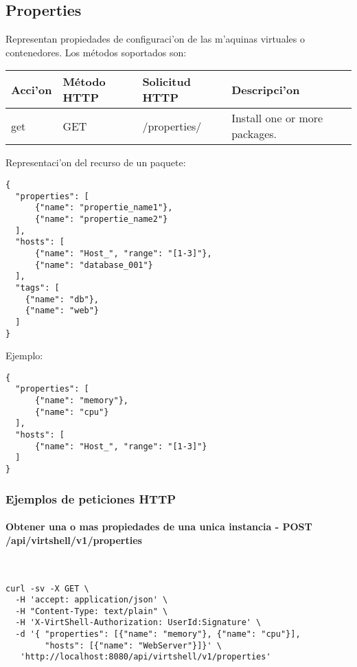 \subsection{Properties}
Representan propiedades de configuraci'on de las m'aquinas virtuales o contenedores. Los métodos soportados son:

\begin{center}
 \begin{tabular}{| l | l | l | l |}
 \hline
  \rowcolor{blueapi}
  \textbf{Acci'on} & \textbf{Método HTTP} & \textbf{Solicitud HTTP} & \textbf{Descripci'on} \\ [0.5ex] 
  \hline\hline
  get & GET & /properties/ & Install one or more packages. \\ [1ex] 
  \hline
\end{tabular}
\end{center}

\vspace{1cm}
Representaci'on del recurso de un paquete:
\vspace{1cm}

\begin{lstlisting}[style=json]
{
  "properties": [
      {"name": "propertie_name1"},
      {"name": "propertie_name2"}
  ],
  "hosts": [ 
      {"name": "Host_", "range": "[1-3]"}, 
      {"name": "database_001"}
  ],
  "tags": [
    {"name": "db"},
    {"name": "web"}
  ]
}
\end{lstlisting}

Ejemplo:

\medskip
\begin{lstlisting}[style=json]
{
  "properties": [
      {"name": "memory"},
      {"name": "cpu"}
  ],
  "hosts": [ 
      {"name": "Host_", "range": "[1-3]"}
  ]
}
\end{lstlisting}

\subsubsection{Ejemplos de peticiones HTTP}

\paragraph{Obtener una o mas propiedades de una unica instancia - POST /api/virtshell/v1/properties} ~\\

\begin{lstlisting}[style=json]
curl -sv -X GET \
  -H 'accept: application/json' \
  -H "Content-Type: text/plain" \
  -H 'X-VirtShell-Authorization: UserId:Signature' \
  -d '{ "properties": [{"name": "memory"}, {"name": "cpu"}],
        "hosts": [{"name": "WebServer"}]}' \
   'http://localhost:8080/api/virtshell/v1/properties'
\end{lstlisting}

